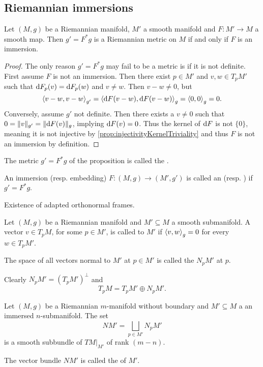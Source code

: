 \subsection{Riemannian immersions}
\begin{proposition}
Let $(M,g)$ be a Riemannian manifold, $M'$ a smooth manifold and $F:M'\to M$ a smooth map. Then $g' = F^*g$ is a Riemannian metric on $M$ \textup{if and only if} $F$ is an immersion.
\end{proposition}
\begin{proof}
The only reason $g' = F^*g$ may fail to be a metric is if it is not definite. First assume $F$ is not an immersion. Then there exist $p\in M'$ and $v,w\in T_pM'$ such that $\operatorname{d \!}{F}_p(v) = \operatorname{d \!}{F}_p(w)$ and $v\neq w$. Then $v-w \neq 0$, but
\[ \left\langle v-w,v-w \right\rangle_{g'}= \left\langle \operatorname{d \!}{F}(v-w),\operatorname{d \!}{F}(v-w) \right\rangle_{g} = \left\langle 0,0 \right\rangle_g = 0. \]
Conversely, assume $g'$ not definite. Then there exists a $v\neq 0$ such that $0 = \lVert v\rVert_{g'}= \lVert\operatorname{d \!}{F}(v)\rVert_{g}$, implying $\operatorname{d \!}{F}(v) = 0$. Thus the kernel of $\operatorname{d \!}{F}$ is not $\{0\}$, meaning it is not injective by \ref{prop:injectivityKernelTriviality} and thus $F$ is not an immersion by definition. 
\end{proof}
The metric $g' = F^*g$ of the proposition is called the .

An immersion (resp. embedding) $F: (M,g)\to (M',g')$ is called an  (resp. ) if $g' = F^*g$.

\begin{lemma}
Existence of adapted orthonormal frames.
\end{lemma}

\begin{definition}
Let $(M,g)$ be a Riemannian manifold and $M'\subseteq M$ a smooth submanifold. A vector $v\in T_pM$, for some $p\in M'$, is called  to $M'$ if $\left\langle v,w \right\rangle_g = 0$ for every $w\in T_pM'$.

The space of all vectors normal to $M'$ at $p\in M'$ is called the  $N_pM'$ at $p$.
\end{definition}
Clearly $N_pM' = (T_pM')^\perp$ and
\[ T_pM = T_pM' \oplus N_pM'. \]

\begin{proposition}
Let $(M,g)$ be a Riemannian $m$-manifold without boundary and $M'\subseteq M$ a an immersed $n$-submanifold. The set
\[ NM' = \bigsqcup_{p\in M'}N_pM' \]
is a smooth subbundle of $TM|_{M'}$ of rank $(m-n)$.
\end{proposition}
The vector bundle $NM'$ is called the  of $M'$.


